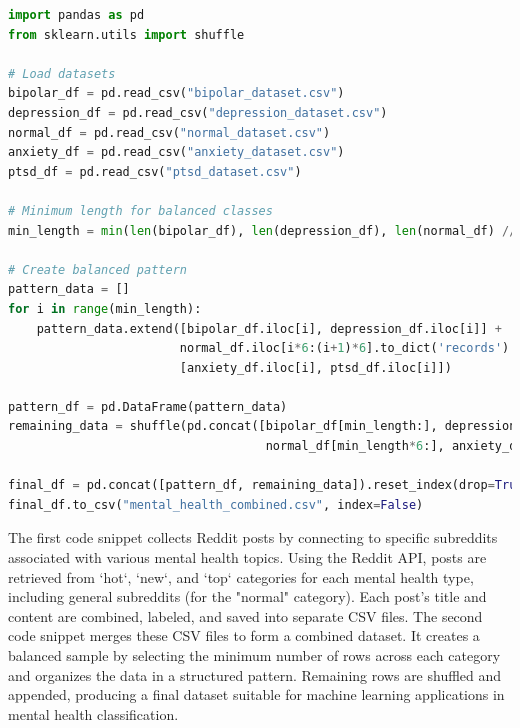 \begin{tcolorbox}[colback=gray!5!white, colframe=gray!80!black, boxrule=0.5pt, title=Combining Collected Datasets]
\begin{lstlisting}[language=Python]
import pandas as pd
from sklearn.utils import shuffle

# Load datasets
bipolar_df = pd.read_csv("bipolar_dataset.csv")
depression_df = pd.read_csv("depression_dataset.csv")
normal_df = pd.read_csv("normal_dataset.csv")
anxiety_df = pd.read_csv("anxiety_dataset.csv")
ptsd_df = pd.read_csv("ptsd_dataset.csv")

# Minimum length for balanced classes
min_length = min(len(bipolar_df), len(depression_df), len(normal_df) // 6, len(anxiety_df), len(ptsd_df))

# Create balanced pattern
pattern_data = []
for i in range(min_length):
    pattern_data.extend([bipolar_df.iloc[i], depression_df.iloc[i]] +
                        normal_df.iloc[i*6:(i+1)*6].to_dict('records') +
                        [anxiety_df.iloc[i], ptsd_df.iloc[i]])

pattern_df = pd.DataFrame(pattern_data)
remaining_data = shuffle(pd.concat([bipolar_df[min_length:], depression_df[min_length:], 
                                    normal_df[min_length*6:], anxiety_df[min_length:], ptsd_df[min_length:]]))

final_df = pd.concat([pattern_df, remaining_data]).reset_index(drop=True)
final_df.to_csv("mental_health_combined.csv", index=False)
\end{lstlisting}
\end{tcolorbox}
    
\noindent
The first code snippet collects Reddit posts by connecting to specific subreddits associated with various mental health topics. Using the Reddit API, posts are retrieved from `hot`, `new`, and `top` categories for each mental health type, including general subreddits (for the "normal" category). Each post’s title and content are combined, labeled, and saved into separate CSV files. The second code snippet merges these CSV files to form a combined dataset. It creates a balanced sample by selecting the minimum number of rows across each category and organizes the data in a structured pattern. Remaining rows are shuffled and appended, producing a final dataset suitable for machine learning applications in mental health classification.
    


